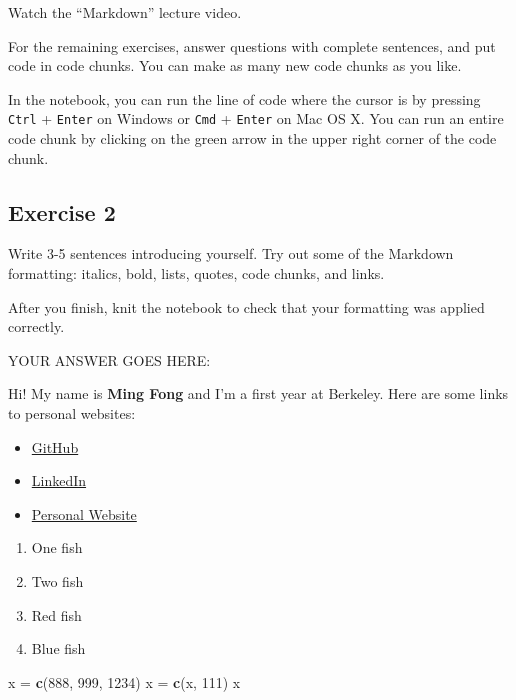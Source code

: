 \documentclass[
]{article}
\newenvironment{Shaded}{\begin{snugshade}}{\end{snugshade}}
\newcommand{\DecValTok}[1]{\textcolor[rgb]{0.00,0.00,0.81}{#1}}
\newcommand{\KeywordTok}[1]{\textcolor[rgb]{0.13,0.29,0.53}{\textbf{#1}}}
\newcommand{\NormalTok}[1]{#1}
\newcommand{\StringTok}[1]{\textcolor[rgb]{0.31,0.60,0.02}{#1}}
\providecommand{\tightlist}{%
  \setlength{\itemsep}{0pt}\setlength{\parskip}{0pt}}
\begin{document}
Watch the ``Markdown'' lecture video.

For the remaining exercises, answer questions with complete sentences,
and put code in code chunks. You can make as many new code chunks as you
like.

In the notebook, you can run the line of code where the cursor is by
pressing \texttt{Ctrl} + \texttt{Enter} on Windows or \texttt{Cmd} +
\texttt{Enter} on Mac OS X. You can run an entire code chunk by clicking
on the green arrow in the upper right corner of the code chunk.

\hypertarget{exercise-2}{%
\subsection{Exercise 2}\label{exercise-2}}

Write 3-5 sentences introducing yourself. Try out some of the Markdown
formatting: italics, bold, lists, quotes, code chunks, and links.

After you finish, knit the notebook to check that your formatting was
applied correctly.

YOUR ANSWER GOES HERE:

Hi! My name is \textbf{Ming Fong} and I'm a first year at Berkeley. Here
are some links to personal websites:

\begin{itemize}
\tightlist
\item
  \href{https://github.com/evilpegasus}{GitHub}
\item
  \href{https://www.linkedin.com/in/mingfong/}{LinkedIn}
\item
  \href{http://mingyfong.github.io/}{Personal Website}
\end{itemize}

\begin{enumerate}
\def\labelenumi{\arabic{enumi}.}
\tightlist
\item
  One fish
\item
  Two fish
\item
  Red fish
\item
  Blue fish
\end{enumerate}

\begin{Shaded}
\begin{Highlighting}[]
\NormalTok{x =}\StringTok{ }\KeywordTok{c}\NormalTok{(}\DecValTok{888}\NormalTok{, }\DecValTok{999}\NormalTok{, }\DecValTok{1234}\NormalTok{)}
\NormalTok{x =}\StringTok{ }\KeywordTok{c}\NormalTok{(x, }\DecValTok{111}\NormalTok{)}
\NormalTok{x}
\end{Highlighting}
\end{Shaded}
\end{document}
